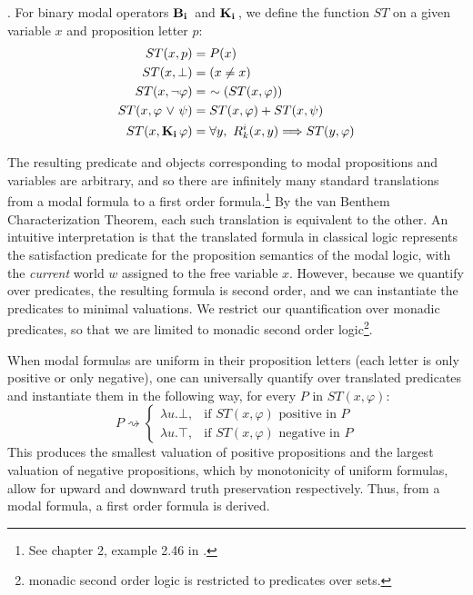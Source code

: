 \begin{definition}. For binary modal operators $\mathbf{B}_{\mathbf{i}}\,$ and $\mathbf{K}_{\mathbf{i}}\,$, we define the function $ST$ on a given variable $x$ and proposition letter $p$:
	\begin{align*}
	ST(x, p) &= P(x) \\
	ST(x, \bot) &= (x \neq x) \\
	ST(x, {\neg}\varphi) &=\ \sim(ST(x, \varphi)) \\
	ST(x, \varphi {\ \vee \ } \psi) &= ST(x, \varphi) + ST(x, \psi)\\
	ST(x, \mathbf{K}_{\mathbf{i}}\,\varphi) &= \forall y,\ R_{k}^i(x,y) \Longrightarrow ST(y, \varphi) \\
	\end{align*}	
\end{definition}
The resulting predicate and objects corresponding to modal propositions and variables are arbitrary, and so there are infinitely many standard translations from a modal formula to a first order formula.\footnote{See chapter 2, example 2.46 in \cite{modal}.} By the van Benthem Characterization Theorem, each such translation is equivalent to the other. An intuitive interpretation is that the translated formula in classical logic represents the satisfaction predicate for the proposition semantics of the modal logic, with the \emph{current} world $w$ assigned to the free variable $x$. However, because we quantify over predicates, the resulting formula is second order, and we can instantiate the predicates to minimal valuations. We restrict our quantification over monadic predicates, so that we are limited to monadic second order logic\footnote{monadic second order logic is restricted to predicates over sets.}.

When modal formulas are uniform in their proposition letters (each letter is only positive or only negative), one can universally quantify over translated predicates and instantiate them in the following way, for every $P$ in $ST(x, \varphi)$:
\[
P \rightsquigarrow 
\begin{cases}
\lambda u.\bot,& \text{if } ST(x, \varphi) \text{ positive in }P\\
\lambda u.\top,& \text{if } ST(x, \varphi) \text{ negative in }P
\end{cases}
\]
This produces the smallest valuation of positive propositions and the largest valuation of negative propositions, which by monotonicity of uniform formulas, allow for upward and downward truth preservation respectively. Thus, from a modal formula, a first order formula is derived.

